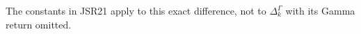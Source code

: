 The constants in JSR21 apply to this exact difference,
not to $\Delta_k^\Gamma$ with its Gamma return omitted.